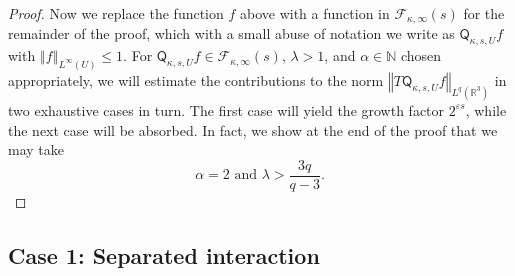 \documentclass{amsart}%
\theoremstyle{plain}
\numberwithin{equation}{section}
\begin{document}
\begin{proof}
Now we replace the function $f$ above with a function in $\mathcal{F}%
_{\kappa,\infty}\left(  s\right)  $ for the remainder of the proof, which with
a small abuse of notation we write as $\mathsf{Q}_{\kappa,s,U}f$ with
$\left\Vert f\right\Vert _{L^{\infty}\left(  U\right)  }\leq1$. For
$\mathsf{Q}_{\kappa,s,U}f\in\mathcal{F}_{\kappa,\infty}\left(  s\right)  $,
$\lambda>1$, and $\alpha\in\mathbb{N}$ chosen appropriately, we will estimate
the contributions to the norm $\left\Vert T\mathsf{Q}_{\kappa,s,U}f\right\Vert
_{L^{q}\left(  \mathbb{R}^{3}\right)  }$ in two exhaustive cases in turn. The
first case will yield the growth factor $2^{\varepsilon s}$, while the next
case will be absorbed. In fact, we show at the end of the proof that we may
take%
\[
\alpha=2\text{\ and }\lambda>\frac{3q}{q-3}.
\]

\end{proof}

\subsection{Case 1: Separated interaction\label{Sub Case 1}}
\end{document}
